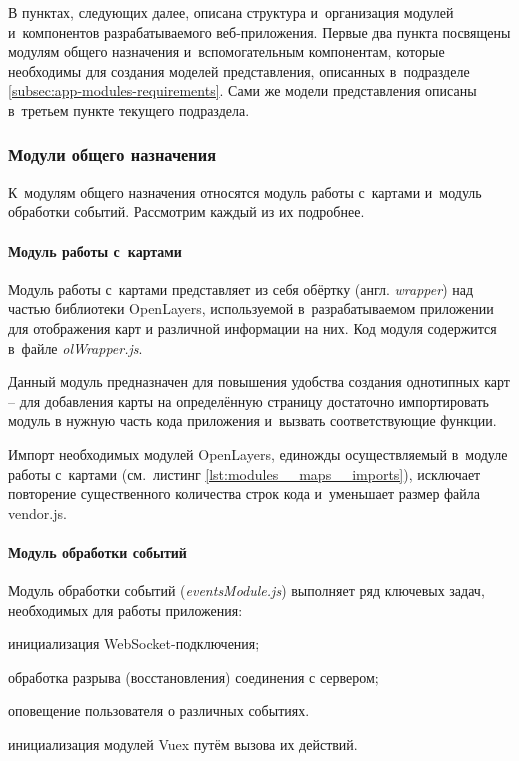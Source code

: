 В пунктах, следующих далее, описана структура и~организация модулей и~компонентов разрабатываемого веб-приложения. Первые два пункта посвящены модулям общего назначения и~вспомогательным компонентам, которые необходимы для создания моделей представления, описанных в~подразделе \ref{subsec:app-modules-requirements}. Сами же модели представления описаны в~третьем пункте текущего подраздела.


\subsubsection{Модули общего назначения}

К~модулям общего назначения относятся модуль работы с~картами и~модуль обработки событий. Рассмотрим каждый из их подробнее.

\paragraph{Модуль работы с~картами}

Модуль работы с~картами представляет из себя обёртку (англ. \emph{wrapper}) над частью библиотеки OpenLayers, используемой в~разрабатываемом приложении для отображения карт и различной информации на них. Код модуля содержится в~файле \emph{olWrapper.js}.

Данный модуль предназначен для повышения удобства создания однотипных карт -- для добавления карты на определённую страницу достаточно импортировать модуль в нужную часть кода приложения и~вызвать соответствующие функции.

Импорт необходимых модулей OpenLayers, единожды осуществляемый в~модуле работы с~картами (см.~листинг \ref{lst:modules__maps__imports}), исключает повторение существенного количества строк кода и~уменьшает размер файла vendor.js.





\paragraph{Модуль обработки событий}

Модуль обработки событий (\emph{eventsModule.js}) выполняет ряд ключевых задач, необходимых для работы приложения:
\begin{dashitemize}
  \item инициализация WebSocket-подключения;
  \item обработка разрыва (восстановления) соединения с сервером;
  \item оповещение пользователя о различных событиях.
  \item инициализация модулей Vuex путём вызова их действий.
\end{dashitemize}


